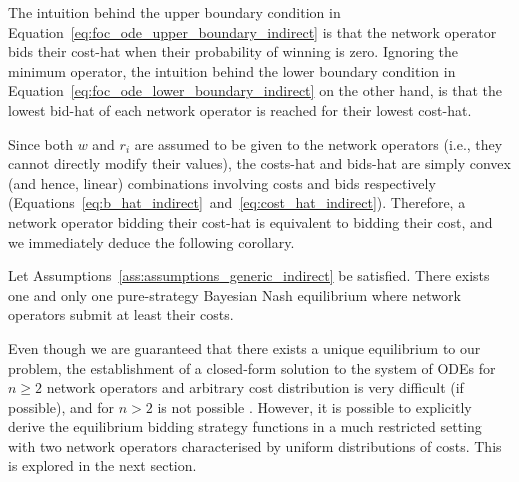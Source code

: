The intuition behind the upper boundary condition in Equation~\eqref{eq:foc_ode_upper_boundary_indirect} is that the network operator bids their cost-hat when their probability of winning is zero. Ignoring the minimum operator, the intuition behind the lower boundary condition in Equation~\eqref{eq:foc_ode_lower_boundary_indirect} on the other hand, is that the lowest bid-hat of each network operator is reached for their lowest cost-hat.

Since both $w$ and $r_i$ are assumed to be given to the network operators (i.e., they cannot directly modify their values), the costs-hat and bids-hat are simply convex (and hence, linear) combinations involving costs and bids respectively (Equations~\eqref{eq:b_hat_indirect}~and~\eqref{eq:cost_hat_indirect}). Therefore, a network operator bidding their cost-hat is equivalent to bidding their cost, and we immediately deduce the following corollary.
\begin{corollary}
\label{cor:characterization_of_the_equilibrium_indirect}
Let Assumptions~\ref{ass:assumptions_generic_indirect} be satisfied. There exists one and only one pure-strategy Bayesian Nash equilibrium where network operators submit at least their costs.
\end{corollary}

Even though we are guaranteed that there exists a unique equilibrium to our problem, the establishment of a closed-form solution to the system of ODEs for $n\ge 2$ network operators and arbitrary cost distribution is very difficult (if possible), and for $n>2$ is not possible \cite{Lebrun2006, Krishna10}. However, it is possible to explicitly derive the equilibrium bidding strategy functions in a much restricted setting with two network operators characterised by uniform distributions of costs. This is explored in the next section.

